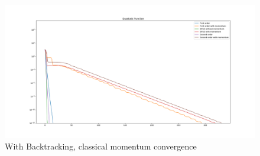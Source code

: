 \documentclass{article}
\begin{document}
\begin{center}
\begin{figure}[H]
	\includegraphics[width=\linewidth]{../Images/quadraticmomentumbacktrack1.png}
	\caption{With Backtracking, classical momentum convergence}
	\label{fig:With Backtracking, classical momentum convergence for quadratic function}
\end{figure}
\end{center}
\end{document}
